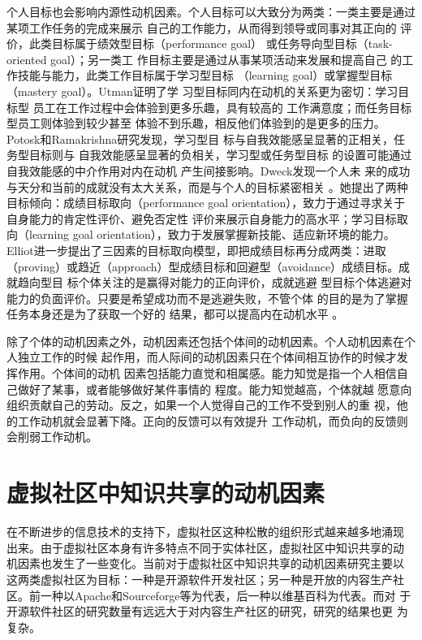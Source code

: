 \documentclass[12pt,a4paper]{ctexart}
\begin{document}
个人目标也会影响内源性动机因素。个人目标可以大致分为两类：一类主要是通过某项工作任务的完成来展示
自己的工作能力，从而得到领导或同事对其正向的
评价，此类目标属于绩效型目标（performance goal）
或任务导向型目标（task-oriented goal）；另一类工
作目标主要是通过从事某项活动来发展和提高自己
的工作技能与能力，此类工作目标属于学习型目标
（learning goal）或掌握型目标（mastery
goal）\cite{LairdJRawsthorne11011999}\cite{Pajares2000}。Utman证明了学
习型目标同内在动机的关系更为密切：学习目标型
员工在工作过程中会体验到更多乐趣，具有较高的
工作满意度；而任务目标型员工则体验到较少甚至
体验不到乐趣，相反他们体验到的是更多的压力\cite{ChristopherHUtman05011997}。Potosk和Ramakrishna研究发现，学习型目
标与自我效能感呈显著的正相关，任务型目标则与
自我效能感呈显著的负相关，学习型或任务型目标
的设置可能通过自我效能感的中介作用对内在动机
产生间接影响\cite{potosky2002mru}。Dweck发现一个人未
来的成功与天分和当前的成就没有太大关系，而是与个人的目标紧密相关
\cite{dweck2000stt}。她提出了两种目标倾向：成绩目标取向（performance
goal orientation），致力于通过寻求关于自身能力的肯定性评价、避免否定性
评价来展示自身能力的高水平；学习目标取向（learning goal
orientation），致力于发展掌握新技能、适应新环境的能力。Elliot进一步提出了三因素的目标取向模型，即把成绩目标再分成两类：进取（proving）或趋近（approach）型成绩目标和回避型（avoidance）成绩目标\cite{elliot1996aaa}。成就趋向型目
标个体关注的是赢得对能力的正向评价，成就逃避
型目标个体逃避对能力的负面评价。只要是希望成功而不是逃避失败，不管个体
的目的是为了掌握任务本身还是为了获取一个好的
结果，都可以提高内在动机水平 。

除了个体的动机因素之外，动机因素还包括个体间的动机因素\cite{Hackman1975}\cite{Hackman1980}。个人动机因素在个人独立工作的时候
起作用，而人际间的动机因素只在个体间相互协作的时候才发挥作用。个体间的动机
因素包括能力直觉和相属感。能力知觉是指一个人相信自己做好了某事，或者能够做好某件事情的
程度\cite{harter1981nsr}\cite{bandura1982sem}。能力知觉越高，个体就越
愿意向组织贡献自己的劳动。反之，如果一个人觉得自己的工作不受到别人的重
视，他的工作动机就会显著下降\cite{Hertel2003}。正向的反馈可以有效提升
工作动机，而负向的反馈则会削弱工作动机。

\section{虚拟社区中知识共享的动机因素}
在不断进步的信息技术的支持下，虚拟社区这种松散的组织形式越来越多地涌现
出来。由于虚拟社区本身有许多特点不同于实体社区，虚拟社区中知识共享的动
机因素也发生了一些变化。当前对于虚拟社区中知识共享的动机因素研究主要以
这两类虚拟社区为目标：一种是开源软件开发社区；另一种是开放的内容生产社
区。前一种以Apache和Sourceforge等为代表，后一种以维基百科为代表。而对
于开源软件社区的研究数量有远远大于对内容生产社区的研究，研究的结果也更
为复杂。




\end{document}
